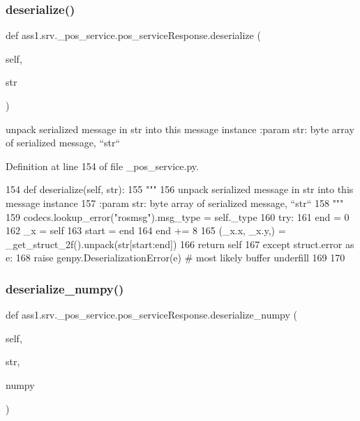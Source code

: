 \subsubsection{\texorpdfstring{deserialize()}{deserialize()}}
{\footnotesize\ttfamily def ass1.\+srv.\+\_\+pos\+\_\+service.\+pos\+\_\+service\+Response.\+deserialize (\begin{DoxyParamCaption}\item[{}]{self,  }\item[{}]{str }\end{DoxyParamCaption})}

\begin{DoxyVerb}unpack serialized message in str into this message instance
:param str: byte array of serialized message, ``str``
\end{DoxyVerb}
 

Definition at line 154 of file \+\_\+pos\+\_\+service.\+py.


\begin{DoxyCode}
154   \textcolor{keyword}{def }deserialize(self, str):
155     \textcolor{stringliteral}{"""}
156 \textcolor{stringliteral}{    unpack serialized message in str into this message instance}
157 \textcolor{stringliteral}{    :param str: byte array of serialized message, ``str``}
158 \textcolor{stringliteral}{    """}
159     codecs.lookup\_error(\textcolor{stringliteral}{"rosmsg"}).msg\_type = self.\_type
160     \textcolor{keywordflow}{try}:
161       end = 0
162       \_x = self
163       start = end
164       end += 8
165       (\_x.x, \_x.y,) = \_get\_struct\_2f().unpack(str[start:end])
166       \textcolor{keywordflow}{return} self
167     \textcolor{keywordflow}{except} struct.error \textcolor{keyword}{as} e:
168       \textcolor{keywordflow}{raise} genpy.DeserializationError(e)  \textcolor{comment}{# most likely buffer underfill}
169 
170 
\end{DoxyCode}
\mbox{\label{classass1_1_1srv_1_1__pos__service_1_1pos__serviceResponse_a9d8f507e3c4d230cba34e3b92bcedfcf}} 
\subsubsection{\texorpdfstring{deserialize\+\_\+numpy()}{deserialize\_numpy()}}
{\footnotesize\ttfamily def ass1.\+srv.\+\_\+pos\+\_\+service.\+pos\+\_\+service\+Response.\+deserialize\+\_\+numpy (\begin{DoxyParamCaption}\item[{}]{self,  }\item[{}]{str,  }\item[{}]{numpy }\end{DoxyParamCaption})}

